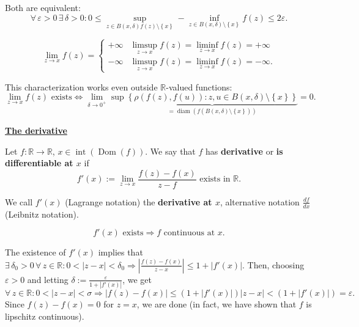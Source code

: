 \documentclass{notes}
\begin{document}
  \begin{prf}
    Both are equivalent: 
    \[
      \forall \, \varepsilon > 0 \, \exists \, \delta > 0: 0 \leq \sup_{z \in B(x, \delta) f(z) \setminus \left \{ x \right \}} - \inf_{z \in B(x, \delta) \setminus \left \{ x \right \}} f(z) \leq 2 \varepsilon.
    \]
  \end{prf}
  
  \begin{defn}
    \[
      \lim_{z \to x} f(z) = \begin{cases}
        +\infty & \limsup_{z \to x} f(z) = \liminf_{z \to x} f(z) = +\infty \\
        -\infty & \limsup_{z \to x} f(z) = \liminf_{z \to x} f(z) = -\infty.
      \end{cases}
    \]
  \end{defn}
  
  \begin{note}
    This characterization works even outside $\mathbb R$-valued functions:
    \[
      \lim_{z \to x} f(z) \text{ exists} \Leftrightarrow \lim_{\delta \to 0^+} \sup \underbrace{\left \{ \rho(f(z), f(u)) : z, u \in B(x, \delta) \setminus \left \{ x \right \} \right \}}_{= \operatorname{diam}(f(B(x, \delta) \setminus \left \{ x \right \}))} = 0.
    \]
  \end{note}
  
  \underline{\boldmath \bfseries The derivative}

  \begin{defn}
    Let $f \colon \mathbb R \to \mathbb R$, $x \in \operatorname{int} (\operatorname{Dom}(f))$.
    We say that $f$ has {\boldmath \bfseries derivative} or {\boldmath \bfseries is differentiable at $x$} if 
    \[
      f'(x) := \lim_{z \to x} \frac{f(z) - f(x)}{z - f} \text{ exists in $\mathbb R$}.
    \]
    
    We call $f'(x)$ (Lagrange notation) the {\boldmath \bfseries derivative at $x$}, alternative notation $\frac{df}{dx}$ (Leibnitz notation).
  \end{defn}
  
  \begin{lem}
    \[
      f'(x) \text{ exists} \Rightarrow \text{$f$ continuous at $x$}.
    \]
  \end{lem}
  
  \begin{prf}
    The existence of $f'(x)$ implies that $\exists \, \delta_0 > 0 \, \forall \, z \in \mathbb R: 0 < \left | z - x \right | < \delta_0 \Rightarrow \left | \frac{f(z) - f(x)}{z - x} \right | \leq 1 + \left | f'(x) \right |$.
    Then, choosing $\varepsilon > 0$ and letting $\delta := \frac{\varepsilon}{1 + \left | f'(x) \right |}$, we get 
    \[
      \forall \, z \in \mathbb R: 0 < \left | z - x \right | < \sigma \mathbb \Rightarrow \left | f(z) - f(x) \right | \leq (1 + \left | f'(x) \right |) \left | z - x \right | < (1 + \left | f'(x) \right |) = \varepsilon.
    \]
    Since $f(z) - f(x) = 0$ for $z = x$, we are done (in fact, we have shown that $f$ is lipschitz continuous).
  \end{prf}
  
\end{document}

